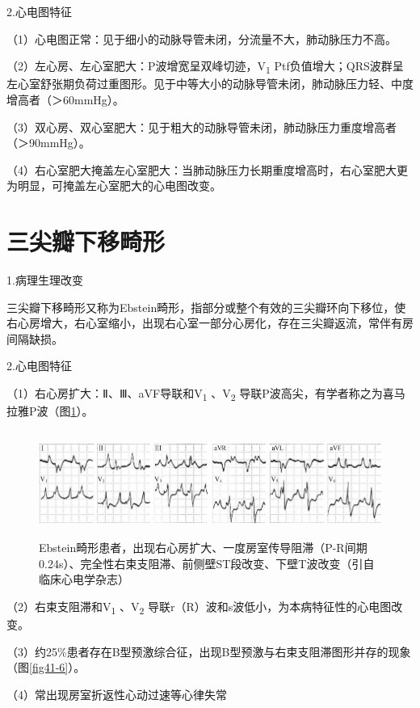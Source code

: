 2.心电图特征

（1）心电图正常：见于细小的动脉导管未闭，分流量不大，肺动脉压力不高。

（2）左心房、左心室肥大：P波增宽呈双峰切迹，V\textsubscript{1}
Ptf负值增大；QRS波群呈左心室舒张期负荷过重图形。见于中等大小的动脉导管未闭，肺动脉压力轻、中度增高者（＞60mmHg）。

（3）双心房、双心室肥大：见于粗大的动脉导管未闭，肺动脉压力重度增高者（＞90mmHg）。

（4）右心室肥大掩盖左心室肥大：当肺动脉压力长期重度增高时，右心室肥大更为明显，可掩盖左心室肥大的心电图改变。

\protect\hypertarget{text00049.htmlux5cux23subid584}{}{}

\section{三尖瓣下移畸形}

1.病理生理改变

三尖瓣下移畸形又称为Ebstein畸形，指部分或整个有效的三尖瓣环向下移位，使右心房增大，右心室缩小，出现右心室一部分心房化，存在三尖瓣返流，常伴有房间隔缺损。

2.心电图特征

（1）右心房扩大：Ⅱ、Ⅲ、aVF导联和V\textsubscript{1} 、V\textsubscript{2}
导联P波高尖，有学者称之为喜马拉雅P波（图\ref{fig41-5}）。

\begin{figure}[!htbp]
 \centering
 \includegraphics[width=5.80208in,height=1.36458in]{./images/Image00687.jpg}
 \captionsetup{justification=centering}
 \caption{Ebstein畸形患者，出现右心房扩大、一度房室传导阻滞（P-R间期0.24s）、完全性右束支阻滞、前侧壁ST段改变、下壁T波改变（引自临床心电学杂志）}
 \label{fig41-5}
  \end{figure} 

（2）右束支阻滞和V\textsubscript{1} 、V\textsubscript{2}
导联r（R）波和s波低小，为本病特征性的心电图改变。

（3）约25\%患者存在B型预激综合征，出现B型预激与右束支阻滞图形并存的现象（图\ref{fig41-6}）。

（4）常出现房室折返性心动过速等心律失常

